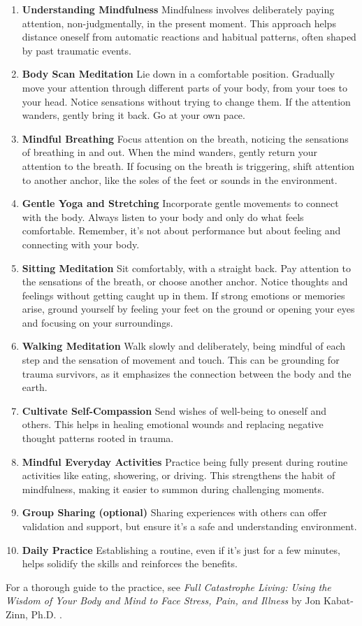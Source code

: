 \documentclass[12pt,letterpaper]{article}
\begin{document}
\begin{enumerate}
    \item \textbf{Understanding Mindfulness} Mindfulness involves deliberately paying attention, non-judgmentally, in the present moment. This approach helps distance oneself from automatic reactions and habitual patterns, often shaped by past traumatic events.
    \item \textbf{Body Scan Meditation} Lie down in a comfortable position. Gradually move your attention through different parts of your body, from your toes to your head. Notice sensations without trying to change them. If the attention wanders, gently bring it back. Go at your own pace.
    \item \textbf{Mindful Breathing} Focus attention on the breath, noticing the sensations of breathing in and out. When the mind wanders, gently return your attention to the breath. If focusing on the breath is triggering, shift attention to another anchor, like the soles of the feet or sounds in the environment.
    \item \textbf{Gentle Yoga and Stretching} Incorporate gentle movements to connect with the body. Always listen to your body and only do what feels comfortable. Remember, it's not about performance but about feeling and connecting with your body.
    \item \textbf{Sitting Meditation} Sit comfortably, with a straight back. Pay attention to the sensations of the breath, or choose another anchor. Notice thoughts and feelings without getting caught up in them. If strong emotions or memories arise, ground yourself by feeling your feet on the ground or opening your eyes and focusing on your surroundings.
    \item \textbf{Walking Meditation} Walk slowly and deliberately, being mindful of each step and the sensation of movement and touch. This can be grounding for trauma survivors, as it emphasizes the connection between the body and the earth.
    \item \textbf{Cultivate Self-Compassion} Send wishes of well-being to oneself and others. This helps in healing emotional wounds and replacing negative thought patterns rooted in trauma.
    \item \textbf{Mindful Everyday Activities} Practice being fully present during routine activities like eating, showering, or driving. This strengthens the habit of mindfulness, making it easier to summon during challenging moments.
    \item \textbf{Group Sharing (optional)} Sharing experiences with others can offer validation and support, but ensure it's a safe and understanding environment.
    \item \textbf{Daily Practice} Establishing a routine, even if it's just for a few minutes, helps solidify the skills and reinforces the benefits.
\end{enumerate}
For a thorough guide to the practice, see \textit{Full Catastrophe Living: Using the Wisdom of Your Body and Mind to Face Stress, Pain, and Illness} by Jon Kabat-Zinn, Ph.D. \cite{kabat-zinnMBSR}.
\end{document}
